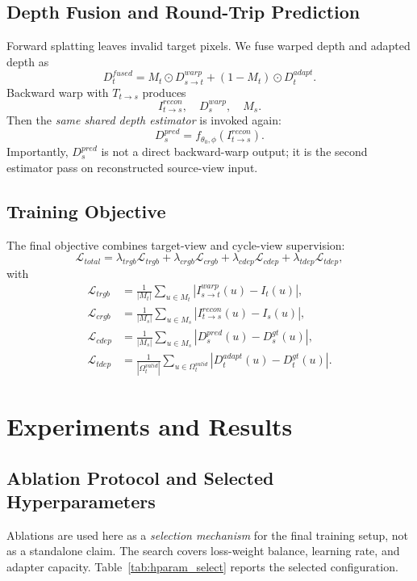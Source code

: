 \documentclass{article}
\begin{document}
\subsection{Depth Fusion and Round-Trip Prediction}
Forward splatting leaves invalid target pixels. We fuse warped depth and adapted depth as
\begin{equation}
D_t^{fused}=M_t\odot D_{s\rightarrow t}^{warp} + (1-M_t)\odot D_t^{adapt}.
\end{equation}
Backward warp with $T_{t\rightarrow s}$ produces
\begin{equation}
I_{t\rightarrow s}^{recon}, \quad D_s^{warp}, \quad M_s.
\end{equation}
Then the \emph{same shared depth estimator} is invoked again:
\begin{equation}
D_s^{pred}=f_{\theta_0,\phi}(I_{t\rightarrow s}^{recon}).
\end{equation}
Importantly, $D_s^{pred}$ is not a direct backward-warp output; it is the second estimator pass on reconstructed source-view input.

\subsection{Training Objective}
The final objective combines target-view and cycle-view supervision:
\begin{equation}
\mathcal{L}_{total}=
\lambda_{trgb}\mathcal{L}_{trgb}+
\lambda_{crgb}\mathcal{L}_{crgb}+
\lambda_{cdep}\mathcal{L}_{cdep}+
\lambda_{tdep}\mathcal{L}_{tdep},
\end{equation}
with
\begin{align}
\mathcal{L}_{trgb}
&=\frac{1}{|M_t|}\sum_{u\in M_t}\left|I_{s\rightarrow t}^{warp}(u)-I_t(u)\right|, \\
\mathcal{L}_{crgb}
&=\frac{1}{|M_s|}\sum_{u\in M_s}\left|I_{t\rightarrow s}^{recon}(u)-I_s(u)\right|, \\
\mathcal{L}_{cdep}
&=\frac{1}{|M_s|}\sum_{u\in M_s}\left|D_s^{pred}(u)-D_s^{gt}(u)\right|, \\
\mathcal{L}_{tdep}
&=\frac{1}{|\Omega_t^{valid}|}\sum_{u\in\Omega_t^{valid}}\left|D_t^{adapt}(u)-D_t^{gt}(u)\right|.
\end{align}

\section{Experiments and Results}
\subsection{Ablation Protocol and Selected Hyperparameters}
Ablations are used here as a \emph{selection mechanism} for the final training setup, not as a standalone claim. The search covers loss-weight balance, learning rate, and adapter capacity. Table~\ref{tab:hparam_select} reports the selected configuration.
\end{document}
